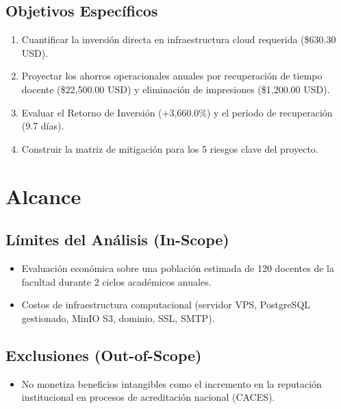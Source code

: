 \documentclass[12pt,a4paper]{article}
\begin{document}
\subsection{Objetivos Específicos}
\begin{enumerate}[leftmargin=1.5em, itemsep=2pt, topsep=2pt]
    \item Cuantificar la inversión directa en infraestructura cloud requerida (\$630.30 USD).
    \item Proyectar los ahorros operacionales anuales por recuperación de tiempo docente (\$22,500.00 USD) y eliminación de impresiones (\$1,200.00 USD).
    \item Evaluar el Retorno de Inversión (+3,660.0\%) y el período de recuperación (9.7 días).
    \item Construir la matriz de mitigación para los 5 riesgos clave del proyecto.
\end{enumerate}

\section{Alcance}

\subsection{Límites del Análisis (In-Scope)}
\begin{itemize}[leftmargin=1.5em, itemsep=2pt]
    \item Evaluación económica sobre una población estimada de 120 docentes de la facultad durante 2 ciclos académicos anuales.
    \item Costos de infraestructura computacional (servidor VPS, PostgreSQL gestionado, MinIO S3, dominio, SSL, SMTP).
\end{itemize}

\subsection{Exclusiones (Out-of-Scope)}
\begin{itemize}[leftmargin=1.5em, itemsep=2pt]
    \item No monetiza beneficios intangibles como el incremento en la reputación institucional en procesos de acreditación nacional (CACES).
\end{itemize}
\end{document}
